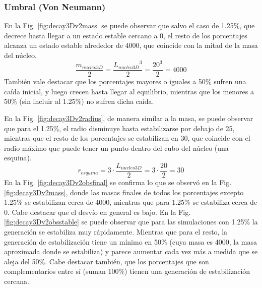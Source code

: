 \subsubsection{Umbral (Von Neumann)}
En la Fig. \ref{fig:decay3Dv2mass} se puede observar que salvo el caso de 1.25\%, que decrece hasta llegar a un estado estable cercano a 0, el resto de los porcentajes alcanza un estado estable alrededor de 4000, que coincide con la mitad de la masa del núcleo.
\begin{equation}
    \frac{m_{nucleo3D}}{2} = \frac{{L_{nucleo3D}}^3}{2} = \frac{20^3}{2} = 4000
\end{equation}
También vale destacar que los porcentajes mayores o iguales a 50\% sufren una caída inicial, y luego crecen hasta llegar al equilibrio, mientras que los menores a 50\% (sin incluir al 1.25\%) no sufren dicha caída.


En la Fig. \ref{fig:decay3Dv2radius}, de manera similar a la masa, se puede observar que para el 1.25\%, el radio disminuye hasta estabilizarse por debajo de 25, mientras que el resto de los porcentajes se estabilizan en 30, que coincide con el radio máximo que puede tener un punto dentro del cubo del núcleo (una esquina).
\begin{equation}
    r_{esquina} = 3 \cdot \frac{L_{nucleo3D}}{2} = 3 \cdot \frac{20}{2} = 30
\end{equation}
En la Fig. \ref{fig:decay3Dv2obsfinal} se confirma lo que se observó en la Fig. \ref{fig:decay3Dv2mass}, donde las masas finales de todos los porcentajes excepto 1.25\% se estabilizan cerca de 4000, mientras que para 1.25\% se estabiliza cerca de 0. Cabe destacar que el desvío en general es bajo.
En la Fig. \ref{fig:decay3Dv2obsstable} se puede observar que para las simulaciones con 1.25\% la generación se estabiliza muy rápidamente. Mientras que para el resto, la generación de estabilización tiene un mínimo en 50\% (cuya masa es 4000, la masa aproximada donde se estabiliza) y parece aumentar cada vez más a medida que se aleja del 50\%. Cabe destacar también, que los porcentajes que son complementarios entre sí (suman 100\%) tienen una generación de estabilización cercana.